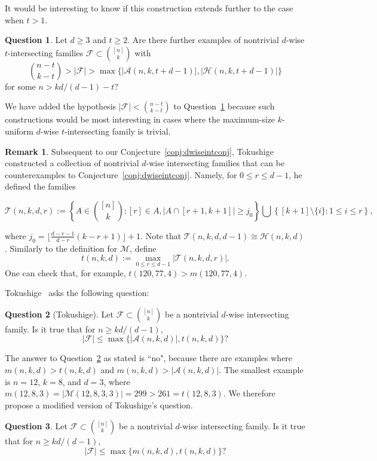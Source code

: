 \documentclass[12pt]{article}
\theoremstyle{definition}
\newtheorem{question}{Question}
\newtheorem{remark}{Remark}
\newcommand{\cH}{\mathcal{H}}
\newcommand{\cA}{\mathcal{A}}
\newcommand{\cF}{\mathcal{F}}
\newcommand{\cM}{\mathcal{M}}
\newcommand{\cT}{\mathcal{T}}
\begin{document}
It would be interesting to know if this construction extends further to the case when $t > 1$.
\begin{question}\label{ques:nontrivdwisetint}
Let $d\ge 3$ and $t\ge 2$. Are there further examples of nontrivial $d$-wise $t$-intersecting families $\cF \subset \binom{[n]}{k}$ with
\[\binom{n-t}{k-t} > |\cF| > \max\{|\cA(n, k, t+d-1)|, |\cH(n, k, t+d-1)|\}\]
for some $n > kd/(d-1) - t$?
\end{question}

We have added the hypothesis $|\cF| < \binom{n-t}{k-t}$ to Question~\ref{ques:nontrivdwisetint} because such constructions would be most interesting in cases where the maximum-size $k$-uniform $d$-wise $t$-intersecting family is trivial. 

\begin{remark}\label{rem:tpkushige}
Subsequent to our Conjecture~\ref{conj:dwiseintconj}, Tokushige~\cite{Tok2} constructed a collection of nontrivial $d$-wise intersecting families that can be counterexamples to Conjecture~\ref{conj:dwiseintconj}. Namely, for $0\le r\le d-1$, he defined the families 

\[\cT(n, k, d, r):= \left\{A\in \binom{[n]}{k}: [r] \in A, |A\cap [r+1, k+1]| \ge j_0\right\} \bigcup \left\{[k+1]\setminus \{i\}: 1\le i\le r\right\},\]

where $j_0 = \lfloor{\frac{d-r-1}{d-r}(k-r+1)\rfloor}+1$. 
Note that $\cT(n, k, d, d-1) \cong \cH(n, k, d)$. Similarly to the definition for $\cM$, define
\[t(n, k, d):= \max_{0\le r\le d-1}|\cT(n, k, d, r)|.\]
One can check that, for example, $t(120, 77, 4) > m(120, 77, 4)$. 

Tokushige~\cite[Problem~2]{Tok2} asks the following question:
\begin{question}[Tokushige]\label{ques:tokushige}
Let $\cF \subset \binom{[n]}{k}$ be a nontrivial $d$-wise intersecting family. Is it true that for $n \ge kd/(d-1)$,
\[|\cF| \le \max\{|\cA(n, k, d)|, t(n, k, d)\}?\]
\end{question}

The answer to Question~\ref{ques:tokushige} as stated is ``no", because there are examples where $m(n, k, d) > t(n, k, d)$ and $m(n, k, d)> |\cA(n, k, d)|$. The smallest example is $n=12$, $k=8$, and $d=3$, where $m(12, 8, 3) = |\cM(12, 8, 3, 3)| = 299 > 261 = t(12, 8, 3)$. We therefore propose a modified version of Tokushige's question. 

\begin{question}\label{ques:linz}
Let $\cF \subset \binom{[n]}{k}$ be a nontrivial $d$-wise intersecting family. Is it true that for $n \ge kd/(d-1)$,
\[|\cF| \le \max\{m(n, k, d), t(n, k, d)\}?\]
\end{question}


\end{remark}
\end{document}
